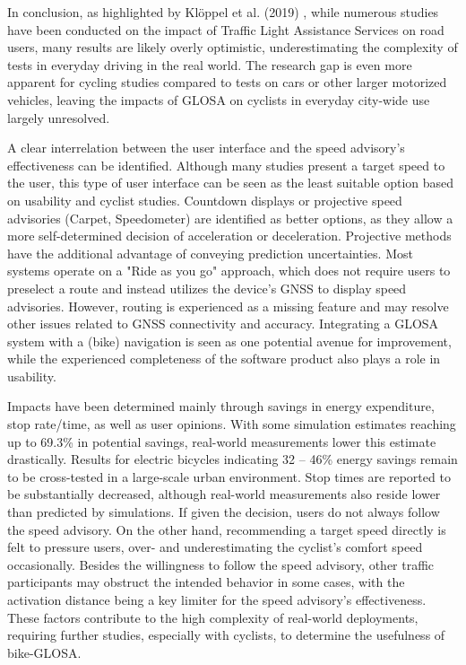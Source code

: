 In conclusion, as highlighted by Klöppel et al. (2019) \cite{kloeppel_performance_2019}, while numerous studies have been conducted on the impact of Traffic Light Assistance Services on road users, many results are likely overly optimistic, underestimating the complexity of tests in everyday driving in the real world. The research gap is even more apparent for cycling studies compared to tests on cars or other larger motorized vehicles, leaving the impacts of GLOSA on cyclists in everyday city-wide use largely unresolved.

\begin{Summary}
A clear interrelation between the user interface and the speed advisory's effectiveness can be identified. Although many studies present a target speed to the user, this type of user interface can be seen as the least suitable option based on usability and cyclist studies. Countdown displays or projective speed advisories (Carpet, Speedometer) are identified as better options, as they allow a more self-determined decision of acceleration or deceleration. Projective methods have the additional advantage of conveying prediction uncertainties. Most systems operate on a "Ride as you go" approach, which does not require users to preselect a route and instead utilizes the device's GNSS to display speed advisories. However, routing is experienced as a missing feature and may resolve other issues related to GNSS connectivity and accuracy. Integrating a GLOSA system with a (bike) navigation is seen as one potential avenue for improvement, while the experienced completeness of the software product also plays a role in usability.

Impacts have been determined mainly through savings in energy expenditure, stop rate/time, as well as user opinions. With some simulation estimates reaching up to 69.3\% in potential savings, real-world measurements lower this estimate drastically. Results for electric bicycles indicating 32 -- 46\% energy savings remain to be cross-tested in a large-scale urban environment. Stop times are reported to be substantially decreased, although real-world measurements also reside lower than predicted by simulations. If given the decision, users do not always follow the speed advisory. On the other hand, recommending a target speed directly is felt to pressure users, over- and underestimating the cyclist's comfort speed occasionally. Besides the willingness to follow the speed advisory, other traffic participants may obstruct the intended behavior in some cases, with the activation distance being a key limiter for the speed advisory's effectiveness. These factors contribute to the high complexity of real-world deployments, requiring further studies, especially with cyclists, to determine the usefulness of bike-GLOSA.
\end{Summary}

